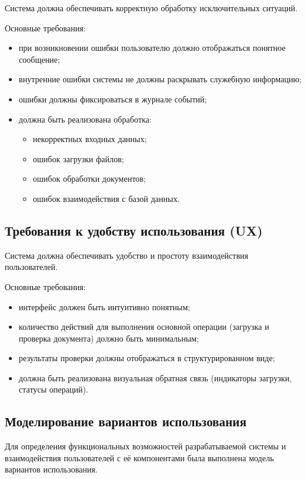 Система должна обеспечивать корректную обработку исключительных ситуаций.

Основные требования:

\begin{itemize}
	\item при возникновении ошибки пользователю должно отображаться понятное сообщение;
	\item внутренние ошибки системы не должны раскрывать служебную информацию;
	\item ошибки должны фиксироваться в журнале событий;
	\item должна быть реализована обработка:
	\begin{itemize}
		\item некорректных входных данных;
		\item ошибок загрузки файлов;
		\item ошибок обработки документов;
		\item ошибок взаимодействия с базой данных.
	\end{itemize}
\end{itemize}

\subsection{Требования к удобству использования (UX)}

Система должна обеспечивать удобство и простоту взаимодействия пользователей.

Основные требования:

\begin{itemize}
	\item интерфейс должен быть интуитивно понятным;
	\item количество действий для выполнения основной операции (загрузка и проверка документа) должно быть минимальным;
	\item результаты проверки должны отображаться в структурированном виде;
	\item должна быть реализована визуальная обратная связь (индикаторы загрузки, статусы операций).
\end{itemize}

\subsection{Моделирование вариантов использования}

Для определения функциональных возможностей разрабатываемой системы и взаимодействия пользователей с её компонентами была выполнена модель вариантов использования.

